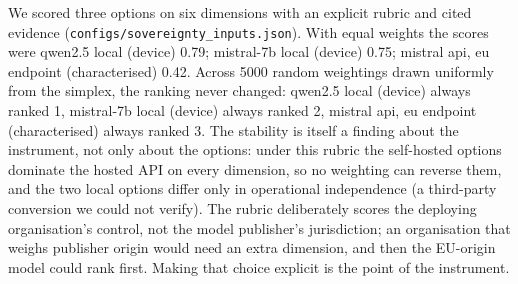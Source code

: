 We scored three options on six dimensions with an explicit rubric and cited evidence (\texttt{configs/sovereignty\_inputs.json}). With equal weights the scores were qwen2.5 local (device) 0.79; mistral-7b local (device) 0.75; mistral api, eu endpoint (characterised) 0.42. Across 5000 random weightings drawn uniformly from the simplex, the ranking never changed: qwen2.5 local (device) always ranked 1, mistral-7b local (device) always ranked 2, mistral api, eu endpoint (characterised) always ranked 3. The stability is itself a finding about the instrument, not only about the options: under this rubric the self-hosted options dominate the hosted API on every dimension, so no weighting can reverse them, and the two local options differ only in operational independence (a third-party conversion we could not verify). The rubric deliberately scores the deploying organisation's control, not the model publisher's jurisdiction; an organisation that weighs publisher origin would need an extra dimension, and then the EU-origin model could rank first. Making that choice explicit is the point of the instrument.

